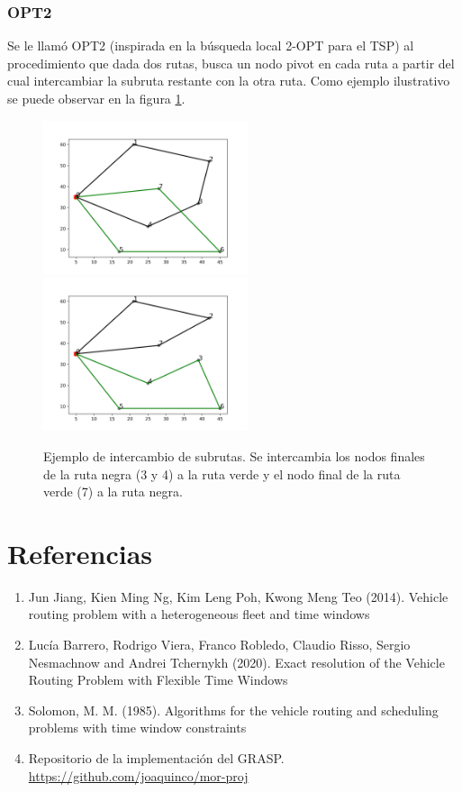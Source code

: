 \documentclass{article}
\begin{document}
  \subsubsection*{OPT2}

  Se le llamó OPT2 (inspirada en la búsqueda local 2-OPT para el TSP) al procedimiento que dada dos rutas, busca un nodo pivot en cada ruta a partir del cual intercambiar la subruta restante con la otra ruta. Como ejemplo ilustrativo se puede observar en la figura \ref{opt2example}.
  
  \begin{figure}
    \centering
    \includegraphics[width=6cm]{resources/opt2/before.png}
    \includegraphics[width=6cm]{resources/opt2/after.png}
    \caption{Ejemplo de intercambio de subrutas. Se intercambia los nodos finales de la ruta negra (3 y 4) a la ruta verde y el nodo final de la ruta verde (7) a la ruta negra.}
    \label{opt2example}
  \end{figure}



  \section*{Referencias}

  \begin{enumerate}
    \item{\label{jiang} Jun Jiang, Kien Ming Ng, Kim Leng Poh, Kwong Meng Teo (2014). Vehicle routing problem with a heterogeneous fleet and time windows}
    \item{\label{inco} Lucía Barrero, Rodrigo Viera, Franco Robledo, Claudio Risso, Sergio Nesmachnow and Andrei Tchernykh (2020). Exact resolution of the Vehicle Routing Problem with Flexible Time Windows}
    \item{\label{solomon} Solomon, M. M. (1985). Algorithms for the vehicle routing and scheduling problems with time window constraints}
    \item{\label{repo} Repositorio de la implementación del GRASP. \url{https://github.com/joaquinco/mor-proj}}
  \end{enumerate}
\end{document}
